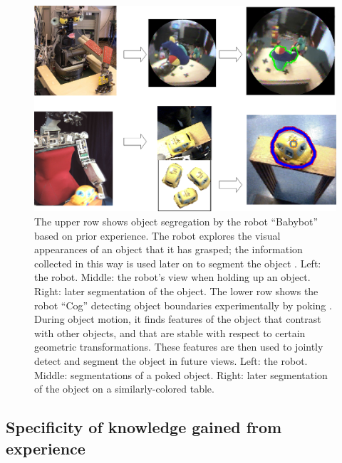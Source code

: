 \begin{figure}[t]

\centerline{
\includegraphics[width=0.75\columnwidth]{fig-robots}
}

\caption[Exploitation of key moments in robotics]{
%
\ifcapped
%
The upper row shows object segregation by the robot ``Babybot'' 
based on prior experience.  
%
The robot explores the visual appearances of an object that
it has grasped; the information collected in this way is used later on to
segment the object \cite{natale05exploring}. 
%
%
Left: the robot.
Middle: the robot's view when holding up an object.
Right: later segmentation of the object.
%
%
The lower row shows the robot ``Cog''
detecting object boundaries experimentally by
poking \cite{fitzpatrick03object}.
%
During object motion, it finds features of the object that contrast with other
objects, and that are stable with respect to certain geometric
transformations.  These features are then used to jointly detect
and segment the object in future views.  Left: the robot.
Middle: segmentations of a poked object.
Right: later segmentation of the object on a
similarly-colored table. 
%
%
\fi
%
}

\label{fig:robot}

\end{figure}





\subsection{Specificity of knowledge gained from experience}


